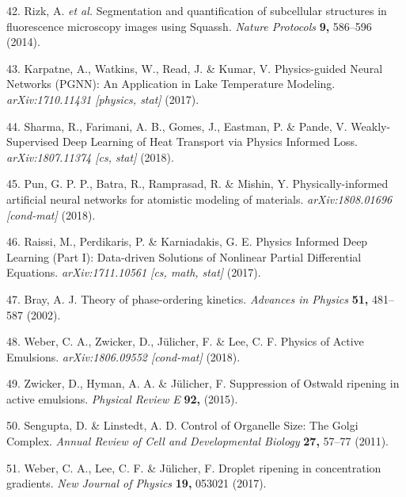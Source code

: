 \documentclass{Dissertate}
\begin{document}
\leavevmode\hypertarget{ref-rizk_segmentation_2014}{}%
42. Rizk, A. \emph{et al.} Segmentation and quantification of
subcellular structures in fluorescence microscopy images using Squassh.
\emph{Nature Protocols} \textbf{9,} 586--596 (2014).

\leavevmode\hypertarget{ref-karpatne_physics-guided_2017}{}%
43. Karpatne, A., Watkins, W., Read, J. \& Kumar, V. Physics-guided
Neural Networks (PGNN): An Application in Lake Temperature Modeling.
\emph{arXiv:1710.11431 {[}physics, stat{]}} (2017).

\leavevmode\hypertarget{ref-sharma_weakly-supervised_2018}{}%
44. Sharma, R., Farimani, A. B., Gomes, J., Eastman, P. \& Pande, V.
Weakly-Supervised Deep Learning of Heat Transport via Physics Informed
Loss. \emph{arXiv:1807.11374 {[}cs, stat{]}} (2018).

\leavevmode\hypertarget{ref-pun_physically-informed_2018}{}%
45. Pun, G. P. P., Batra, R., Ramprasad, R. \& Mishin, Y.
Physically-informed artificial neural networks for atomistic modeling of
materials. \emph{arXiv:1808.01696 {[}cond-mat{]}} (2018).

\leavevmode\hypertarget{ref-raissi_physics_2017-1}{}%
46. Raissi, M., Perdikaris, P. \& Karniadakis, G. E. Physics Informed
Deep Learning (Part I): Data-driven Solutions of Nonlinear Partial
Differential Equations. \emph{arXiv:1711.10561 {[}cs, math, stat{]}}
(2017).

\leavevmode\hypertarget{ref-bray_theory_2002}{}%
47. Bray, A. J. Theory of phase-ordering kinetics. \emph{Advances in
Physics} \textbf{51,} 481--587 (2002).

\leavevmode\hypertarget{ref-weber_physics_2018}{}%
48. Weber, C. A., Zwicker, D., Jülicher, F. \& Lee, C. F. Physics of
Active Emulsions. \emph{arXiv:1806.09552 {[}cond-mat{]}} (2018).

\leavevmode\hypertarget{ref-zwicker_suppression_2015}{}%
49. Zwicker, D., Hyman, A. A. \& Jülicher, F. Suppression of Ostwald
ripening in active emulsions. \emph{Physical Review E} \textbf{92,}
(2015).

\leavevmode\hypertarget{ref-sengupta_control_2011}{}%
50. Sengupta, D. \& Linstedt, A. D. Control of Organelle Size: The Golgi
Complex. \emph{Annual Review of Cell and Developmental Biology}
\textbf{27,} 57--77 (2011).

\leavevmode\hypertarget{ref-weber_droplet_2017}{}%
51. Weber, C. A., Lee, C. F. \& Jülicher, F. Droplet ripening in
concentration gradients. \emph{New Journal of Physics} \textbf{19,}
053021 (2017).
\end{document}
